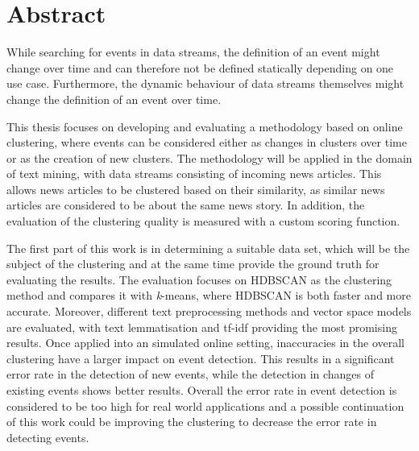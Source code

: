 
\section*{Abstract}


While searching for events in data streams, the definition of an event might change over time and can therefore not be defined statically depending on one use case. Furthermore, the dynamic behaviour of data streams themselves might change the definition of an event over time.

This thesis focuses on developing and evaluating a methodology based on online clustering, where events can be considered either as changes in clusters over time or as the creation of new clusters. The methodology will be applied in the domain of text mining, with data streams consisting of incoming news articles. This allows news articles to be clustered based on their similarity, as similar news articles are considered to be about the same news story. In addition, the evaluation of the clustering quality is measured with a custom scoring function.

The first part of this work is in determining a suitable data set, which will be the subject of the clustering and at the same time provide the ground truth for evaluating the results. The evaluation focuses on HDBSCAN as the clustering method and compares it with \textit{k}-means, where HDBSCAN is both faster and more accurate. Moreover, different text preprocessing methods and vector space models are evaluated, with text lemmatisation and tf-idf providing the most promising results. Once applied into an simulated online setting, inaccuracies in the overall clustering have a larger impact on event detection. This results in a significant error rate in the detection of new events, while the detection in changes of existing events shows better results. Overall the error rate in event detection is considered to be too high for real world applications and a possible continuation of this work could be improving the clustering to decrease the error rate in detecting events.



